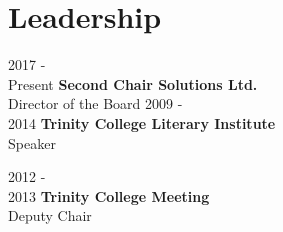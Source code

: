 \documentclass[letterpaper]{twentysecondcv} %
\begin{document}
\vfill

\section{Leadership}
\begin{twentyshort}
\twentyitemshort
		{2017 - \\ Present}
		{\textbf{Second Chair Solutions Ltd.} \\ Director of the Board}
\twentyitemshort
   		{2009 - \\ 2014}
        {\textbf{Trinity College Literary Institute} \\ Speaker}

\twentyitemshort
   		{2012 - \\ 2013}
        {\textbf{Trinity College Meeting} \\ Deputy Chair}



\end{twentyshort}
\vfill
\end{document}
